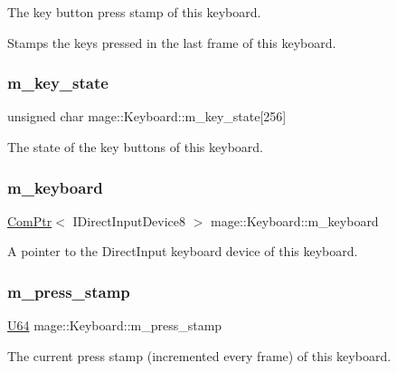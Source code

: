The key button press stamp of this keyboard.

Stamps the keys pressed in the last frame of this keyboard. \hypertarget{classmage_1_1_keyboard_a7499df459499f5addd50507ea1e2358c}{}\label{classmage_1_1_keyboard_a7499df459499f5addd50507ea1e2358c} 
\subsubsection{\texorpdfstring{m\+\_\+key\+\_\+state}{m\_key\_state}}
{\footnotesize\ttfamily unsigned char mage\+::\+Keyboard\+::m\+\_\+key\+\_\+state\mbox{[}256\mbox{]}\hspace{0.3cm}{\ttfamily [private]}}

The state of the key buttons of this keyboard. \hypertarget{classmage_1_1_keyboard_a992b8b8caf0d858163e5e9af04302324}{}\label{classmage_1_1_keyboard_a992b8b8caf0d858163e5e9af04302324} 
\subsubsection{\texorpdfstring{m\+\_\+keyboard}{m\_keyboard}}
{\footnotesize\ttfamily \hyperlink{namespacemage_ae74f374780900893caa5555d1031fd79}{Com\+Ptr}$<$ I\+Direct\+Input\+Device8 $>$ mage\+::\+Keyboard\+::m\+\_\+keyboard\hspace{0.3cm}{\ttfamily [private]}}

A pointer to the Direct\+Input keyboard device of this keyboard. \hypertarget{classmage_1_1_keyboard_a075349dbce5145f46146ccdfea78214a}{}\label{classmage_1_1_keyboard_a075349dbce5145f46146ccdfea78214a} 
\subsubsection{\texorpdfstring{m\+\_\+press\+\_\+stamp}{m\_press\_stamp}}
{\footnotesize\ttfamily \hyperlink{namespacemage_a6672cf3c861707ce4a3235a3eb43941d}{U64} mage\+::\+Keyboard\+::m\+\_\+press\+\_\+stamp\hspace{0.3cm}{\ttfamily [private]}}

The current press stamp (incremented every frame) of this keyboard. 